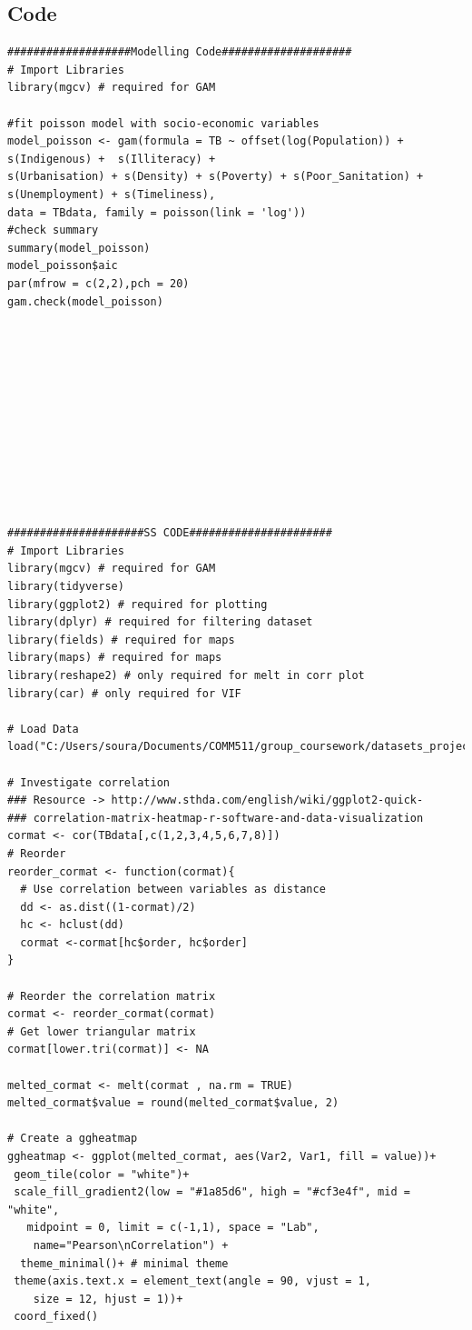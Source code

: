 \documentclass{article}
\begin{document}
\subsection{Code}
\begin{verbatim}
###################Modelling Code####################
# Import Libraries
library(mgcv) # required for GAM 

#fit poisson model with socio-economic variables
model_poisson <- gam(formula = TB ~ offset(log(Population)) + s(Indigenous) +  s(Illiteracy) +  
s(Urbanisation) + s(Density) + s(Poverty) + s(Poor_Sanitation) + s(Unemployment) + s(Timeliness), 
data = TBdata, family = poisson(link = 'log'))
#check summary
summary(model_poisson)
model_poisson$aic
par(mfrow = c(2,2),pch = 20)
gam.check(model_poisson)












#####################SS CODE######################
# Import Libraries
library(mgcv) # required for GAM 
library(tidyverse) 
library(ggplot2) # required for plotting
library(dplyr) # required for filtering dataset
library(fields) # required for maps
library(maps) # required for maps
library(reshape2) # only required for melt in corr plot
library(car) # only required for VIF

# Load Data
load("C:/Users/soura/Documents/COMM511/group_coursework/datasets_project.RData")

# Investigate correlation
### Resource -> http://www.sthda.com/english/wiki/ggplot2-quick-
### correlation-matrix-heatmap-r-software-and-data-visualization
cormat <- cor(TBdata[,c(1,2,3,4,5,6,7,8)])
# Reorder
reorder_cormat <- function(cormat){
  # Use correlation between variables as distance
  dd <- as.dist((1-cormat)/2)
  hc <- hclust(dd)
  cormat <-cormat[hc$order, hc$order]
}

# Reorder the correlation matrix
cormat <- reorder_cormat(cormat)
# Get lower triangular matrix
cormat[lower.tri(cormat)] <- NA

melted_cormat <- melt(cormat , na.rm = TRUE)
melted_cormat$value = round(melted_cormat$value, 2)

# Create a ggheatmap
ggheatmap <- ggplot(melted_cormat, aes(Var2, Var1, fill = value))+
 geom_tile(color = "white")+
 scale_fill_gradient2(low = "#1a85d6", high = "#cf3e4f", mid = "white", 
   midpoint = 0, limit = c(-1,1), space = "Lab", 
    name="Pearson\nCorrelation") +
  theme_minimal()+ # minimal theme
 theme(axis.text.x = element_text(angle = 90, vjust = 1, 
    size = 12, hjust = 1))+
 coord_fixed()


\end{verbatim}
\end{document}
